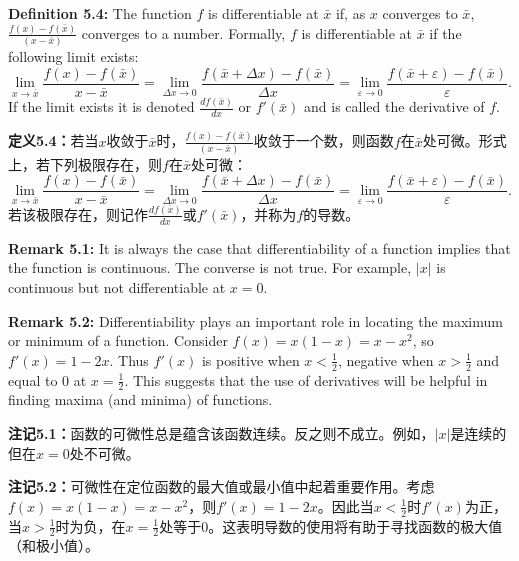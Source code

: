 \begin{original}
\textbf{Definition 5.4:} The function $f$ is differentiable at $\bar{x}$ if, as $x$ converges to $\bar{x}$, $\frac{f(x)-f(\bar{x})}{(x-\bar{x})}$ converges to a number. Formally, $f$ is differentiable at $\bar{x}$ if the following limit exists:
\[
\lim_{x \to \bar{x}} \frac{f(x) - f(\bar{x})}{x - \bar{x}} = \lim_{\Delta x \to 0} \frac{f(\bar{x} + \Delta x) - f(\bar{x})}{\Delta x} = \lim_{\varepsilon \to 0} \frac{f(\bar{x} + \varepsilon) - f(\bar{x})}{\varepsilon}.
\]
If the limit exists it is denoted $\frac{d f(\bar{x})}{dx}$ or $f'(\bar{x})$ and is called the derivative of $f$.
\end{original}
\begin{translation}
\textbf{定义5.4：}若当$x$收敛于$\bar{x}$时，$\frac{f(x)-f(\bar{x})}{(x-\bar{x})}$收敛于一个数，则函数$f$在$\bar{x}$处可微。形式上，若下列极限存在，则$f$在$\bar{x}$处可微：
\[
\lim_{x \to \bar{x}} \frac{f(x) - f(\bar{x})}{x - \bar{x}} = \lim_{\Delta x \to 0} \frac{f(\bar{x} + \Delta x) - f(\bar{x})}{\Delta x} = \lim_{\varepsilon \to 0} \frac{f(\bar{x} + \varepsilon) - f(\bar{x})}{\varepsilon}.
\]
若该极限存在，则记作$\frac{d f(\bar{x})}{dx}$或$f'(\bar{x})$，并称为$f$的导数。
\end{translation}

\begin{original}
\textbf{Remark 5.1:} It is always the case that differentiability of a function implies that the function is continuous. The converse is not true. For example, $|x|$ is continuous but not differentiable at $x = 0$.

\textbf{Remark 5.2:} Differentiability plays an important role in locating the maximum or minimum of a function. Consider $f(x) = x(1-x) = x - x^2$, so $f'(x) = 1-2x$. Thus $f'(x)$ is positive when $x < \frac{1}{2}$, negative when $x > \frac{1}{2}$ and equal to 0 at $x = \frac{1}{2}$. This suggests that the use of derivatives will be helpful in finding maxima (and minima) of functions.
\end{original}
\begin{translation}
\textbf{注记5.1：}函数的可微性总是蕴含该函数连续。反之则不成立。例如，$|x|$是连续的但在$x = 0$处不可微。

\textbf{注记5.2：}可微性在定位函数的最大值或最小值中起着重要作用。考虑$f(x) = x(1-x) = x - x^2$，则$f'(x) = 1-2x$。因此当$x < \frac{1}{2}$时$f'(x)$为正，当$x > \frac{1}{2}$时为负，在$x = \frac{1}{2}$处等于0。这表明导数的使用将有助于寻找函数的极大值（和极小值）。
\end{translation}

